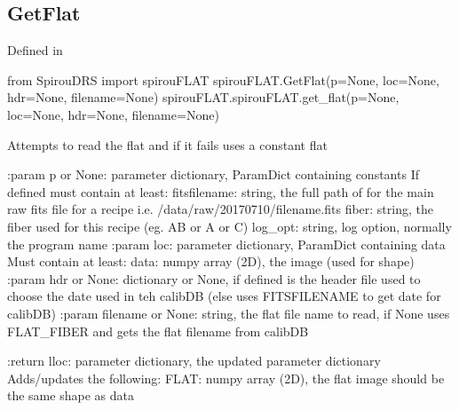 \noindent\begin{minipage}{\textwidth}
\subsection{GetFlat}

Defined in \spirouFLAT{}

\begin{pythonbox}
from SpirouDRS import spirouFLAT
spirouFLAT.GetFlat(p=None, loc=None, hdr=None, filename=None)
spirouFLAT.spirouFLAT.get_flat(p=None, loc=None, hdr=None, filename=None)
\end{pythonbox}

\begin{pythondocstring}
    Attempts to read the flat and if it fails uses a constant flat

    :param p or None: parameter dictionary, ParamDict containing constants
        If defined must contain at least:
            fitsfilename: string, the full path of for the main raw fits
                          file for a recipe
                          i.e. /data/raw/20170710/filename.fits
            fiber: string, the fiber used for this recipe (eg. AB or A or C)
            log_opt: string, log option, normally the program name
    :param loc: parameter dictionary, ParamDict containing data
        Must contain at least:
            data: numpy array (2D), the image (used for shape)
    :param hdr or None: dictionary or None, if defined is the header file used
                        to choose the date used in teh calibDB (else uses
                        FITSFILENAME to get date for calibDB)
    :param filename or None: string, the flat file name to read, if None
                             uses FLAT_{FIBER} and gets the flat filename from
                             calibDB

    :return lloc: parameter dictionary, the updated parameter dictionary
            Adds/updates the following:
                FLAT: numpy array (2D), the flat image should be the same
                      shape as data
\end{pythondocstring}
\end{minipage}



